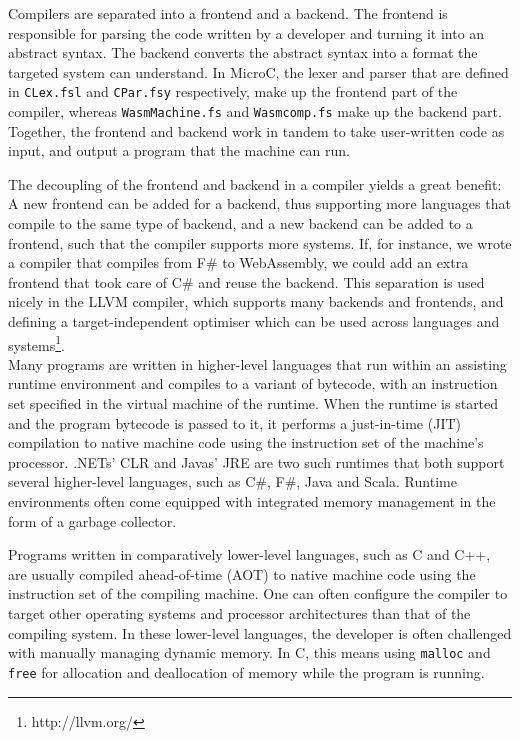 \documentclass[a4paper]{article}
\begin{document}
Compilers are separated into a frontend and a backend. The frontend is responsible for parsing the code written by a developer and turning it into an abstract syntax. The backend converts the abstract syntax into a format the targeted system can understand. In MicroC, the lexer and parser that are defined in \texttt{CLex.fsl} and \texttt{CPar.fsy} respectively, make up the frontend part of the compiler, whereas \texttt{WasmMachine.fs} and \texttt{Wasmcomp.fs} make up the backend part. Together, the frontend and backend work in tandem to take user-written code as input, and output a program that the machine can run.

The decoupling of the frontend and backend in a compiler yields a great benefit: A new frontend can be added for a backend, thus supporting more languages that compile to the same type of backend, and a new backend can be added to a frontend, such that the compiler supports more systems. If, for instance, we wrote a compiler that compiles from F\# to WebAssembly, we could add an extra frontend that took care of C\# and reuse the backend. This separation is used nicely in the LLVM compiler, which supports many backends and frontends, and defining a target-independent optimiser which can be used across languages and systems\footnote{http://llvm.org/}.\\

Many programs are written in higher-level languages that run within an assisting runtime environment and compiles to a variant of bytecode, with an instruction set specified in the virtual machine of the runtime. When the runtime is started and the program bytecode is passed to it, it performs a just-in-time (JIT) compilation to native machine code using the instruction set of the machine's processor. .NETs' CLR and Javas' JRE are two such runtimes that both support several higher-level languages, such as C\#, F\#, Java and Scala. Runtime environments often come equipped with integrated memory management in the form of a garbage collector.

Programs written in comparatively lower-level languages, such as C and C++, are usually compiled ahead-of-time (AOT) to native machine code using the instruction set of the compiling machine. One can often configure the compiler to target other operating systems and processor architectures than that of the compiling system. In these lower-level languages, the developer is often challenged with manually managing dynamic memory. In C, this means using \texttt{malloc} and \texttt{free} for allocation and deallocation of memory while the program is running.
\end{document}
